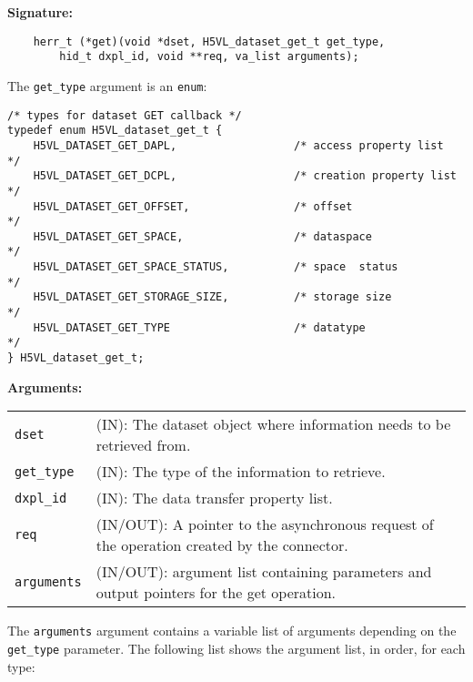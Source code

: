 \begin{mdframed}[style=bgbox]
\textbf{Signature:}
\begin{lstlisting}
    herr_t (*get)(void *dset, H5VL_dataset_get_t get_type, 
        hid_t dxpl_id, void **req, va_list arguments);
\end{lstlisting}

The \texttt{get\_type} argument is an \texttt{enum}:
\begin{lstlisting}
/* types for dataset GET callback */
typedef enum H5VL_dataset_get_t {                                                
    H5VL_DATASET_GET_DAPL,                  /* access property list                */
    H5VL_DATASET_GET_DCPL,                  /* creation property list              */
    H5VL_DATASET_GET_OFFSET,                /* offset                              */
    H5VL_DATASET_GET_SPACE,                 /* dataspace                           */
    H5VL_DATASET_GET_SPACE_STATUS,          /* space  status                       */
    H5VL_DATASET_GET_STORAGE_SIZE,          /* storage size                        */
    H5VL_DATASET_GET_TYPE                   /* datatype                            */
} H5VL_dataset_get_t; 
\end{lstlisting}

\textbf{Arguments:}\\
\begin{tabular}{l p{13.5cm}}
  \texttt{dset} & (IN): The dataset object where information needs to be
  retrieved from.\\
  \texttt{get\_type} & (IN): The type of the information to retrieve.\\
  \texttt{dxpl\_id} & (IN): The data transfer property list.\\
  \texttt{req} & (IN/OUT): A pointer to the asynchronous request of the
  operation created by the connector.\\
  \texttt{arguments} & (IN/OUT): argument list containing parameters and
  output pointers for the get operation. \\
\end{tabular}
\end{mdframed}

The \texttt{arguments} argument contains a variable list of arguments
depending on the \texttt{get\_type} parameter. The following list shows
the argument list, in order, for each type:

